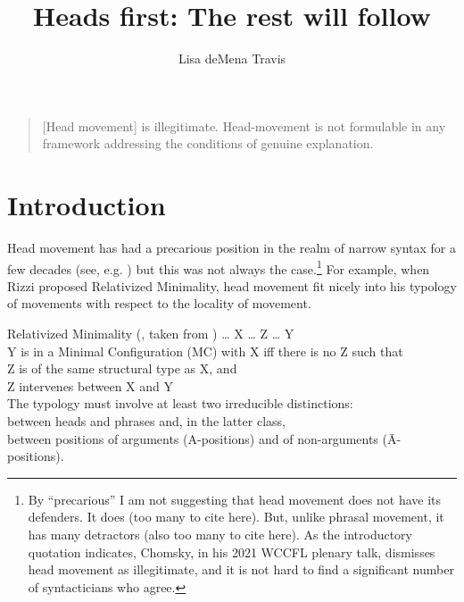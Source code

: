 \documentclass[output=paper,colorlinks,citecolor=brown,
]{langscibook}
\author{Lisa deMena Travis\affiliation{McGill University}\orcid{}}
\title{Heads first: The rest will follow}
\begin{document}
\maketitle


\begin{quote}[Head movement] is illegitimate.  Head-movement is not formulable in any framework addressing the conditions of genuine explanation.\\
 \hspace*{\fill} \citep[42:19]{Chomsky:2021}
\end{quote}

\section{Introduction}

Head movement has had a precarious position in the realm of narrow syntax for a few decades (see, e.g. \citealt[37--39]{Chomsky:2001a}) but this was not always the case.\footnote{By “precarious”  I am not suggesting that  head movement does not have its defenders.  It does (too many to cite here).  But, unlike phrasal movement, it has many detractors (also too many to cite here).  As the introductory quotation indicates, Chomsky, in his 2021 WCCFL plenary talk, dismisses head movement as illegitimate, and it is not hard to find a significant number of syntacticians who agree.} For example, when Rizzi proposed Relativized Minimality, head movement fit nicely into his typology of movements with respect to the locality of movement.  

\ea Relativized Minimality (\citealt{Rizzi:1990}, taken from \citealt{Rizzi:2001a})
    \ea \ldots{} X \ldots{} Z \ldots{} Y\\
    \ex Y is in a Minimal Configuration (MC) with X iff there is no Z such that\\
        \ea Z is of the same structural type as X, and\\
        \ex Z intervenes between X and Y\\
        \z
    \ex The typology must involve at least two irreducible\label{ex:RMc}
    distinctions:\\
        \ea between heads and phrases and, in the latter class,\\
        \ex between positions of arguments (A-positions) and of non-arguments
    (\=A-positions).
        \z
    \z
\z
\end{document}
